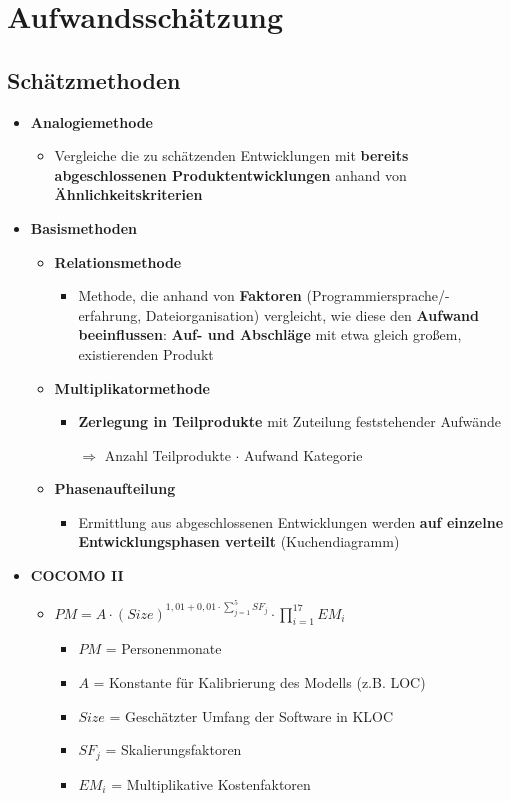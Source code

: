 \section{Aufwandsschätzung}
		
	\subsection{Schätzmethoden}
			
		\begin{itemize}
			\item \textbf{Analogiemethode}
			\begin{itemize}
				\item Vergleiche die zu schätzenden Entwicklungen mit \textbf{bereits abgeschlossenen Produktentwicklungen} anhand von \textbf{Ähnlichkeitskriterien}
			\end{itemize}
			\item \textbf{\textbf{Basismethoden}}
			\begin{itemize}
				\item \textbf{Relationsmethode}
				\begin{itemize}
					\item Methode, die anhand von \textbf{Faktoren} (Programmiersprache/-erfahrung, Dateiorganisation) vergleicht, wie diese den \textbf{Aufwand beeinflussen}: \textbf{Auf- und Abschläge} mit etwa gleich großem, existierenden Produkt
				\end{itemize}
				\item \textbf{Multiplikatormethode}
				\begin{itemize}
					\item \textbf{Zerlegung in Teilprodukte} mit Zuteilung feststehender Aufwände
									
					$\Rightarrow$ Anzahl Teilprodukte {\Large $\cdot$} Aufwand Kategorie
				\end{itemize}
				\item \textbf{Phasenaufteilung}
				\begin{itemize}
					\item Ermittlung aus abgeschlossenen Entwicklungen werden \textbf{auf einzelne Entwicklungsphasen verteilt} (Kuchendiagramm)
				\end{itemize}
			\end{itemize}
			\item \textbf{COCOMO II}
			\begin{itemize}
				\item {\LARGE $PM = A \cdot (Size)^{1,01 + 0,01 \cdot {\sum_{j=1}^{5} SF_{j}}} \cdot \prod_{i=1}^{17} EM_{i}$}
				\begin{itemize}
					\item $PM$ = Personenmonate
					\item $A$ = Konstante für Kalibrierung des Modells (z.B. LOC)
					\item $Size$ = Geschätzter Umfang der Software in KLOC
					\item $SF_{j}$ = Skalierungsfaktoren
					\item $EM_{i}$ = Multiplikative Kostenfaktoren
				\end{itemize}
			\end{itemize}
		\end{itemize}